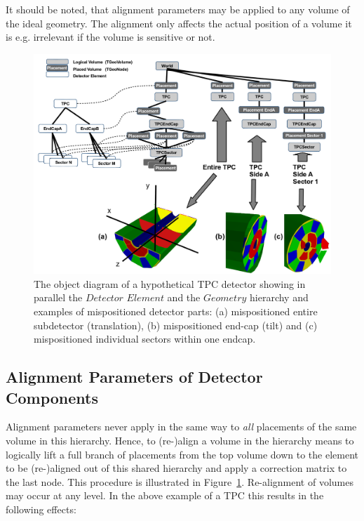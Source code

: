 \documentclass[10pt,a4paper]{article}
\begin{document}
\noindent
It should be noted, that alignment parameters may be applied to any volume 
of the ideal geometry. The alignment only affects the actual position of 
a volume it is e.g. irrelevant if the volume is sensitive or not.

\begin{figure}[h]
  \begin{center}
    \includegraphics[width=160mm] {DDAlign_detelement_aligned_tree}
    \caption{The object diagram of a hypothetical TPC detector showing in
    parallel the $Detector$ $Element$ and the $Geometry$ hierarchy and examples
    of mispositioned detector parts: (a) mispositioned entire subdetector 
    (translation), (b) mispositioned end-cap (tilt) and (c) mispositioned
    individual sectors within one endcap.}
    \label{fig:dd4hep-aligned-hierarchies}
  \end{center}
\end{figure}



\subsection{Alignment Parameters of Detector Components}
\label{subsect:ddalign-intro-aligments}
\noindent
Alignment parameters never apply in the same way to {\it{all}} placements of the 
same volume in this hierarchy. Hence, to (re-)align a volume in the hierarchy
means to logically lift a full branch of placements from the top volume down to
the element to be (re-)aligned out of this shared hierarchy and apply
a correction matrix to the last node. This procedure is illustrated in 
Figure~\ref{fig:dd4hep-aligned-hierarchies}. Re-alignment of volumes may occur
at any level. In the above example of a TPC this results in the following effects:
\end{document}

